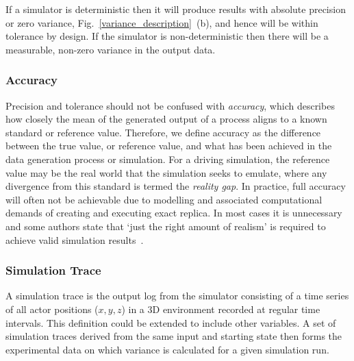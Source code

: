 \documentclass[letterpaper, 10 pt, journal, twoside]{IEEEtran}
\begin{document}
If a simulator is deterministic then it will produce results with absolute precision or zero variance, Fig.~\ref{variance_description}~(b), and hence will be within tolerance by design. If the simulator is non-deterministic then there will be a measurable, non-zero variance in the output data.\\
%

\subsubsection{Accuracy}
Precision and tolerance should not be confused with \textit{accuracy}, which describes how closely the mean of the generated output of a process aligns to a known standard or reference value. Therefore, we define accuracy as the difference between the true value, or reference value, and what has been achieved in the data generation process or simulation. 
%
For a driving simulation, the reference value 
may be the real world that the simulation seeks to emulate, where any divergence from this standard is termed the \textit{reality gap}. 
%
In practice, full accuracy will often not be achievable due to modelling and associated computational demands of creating and executing exact replica. In most cases it is unnecessary and some authors state that `just the right amount of realism' is required to achieve valid simulation results~\cite{Koopman2018}. \\

\subsubsection{Simulation Trace}
A simulation trace is the output log from the simulator consisting of a time series of all actor positions ($x,y,z$) in a 3D environment recorded at regular time intervals. This definition could be extended to include other variables. %
A set of simulation traces derived from the same input and starting state then forms the experimental data on which variance is calculated for a given simulation run. \\
\end{document}
